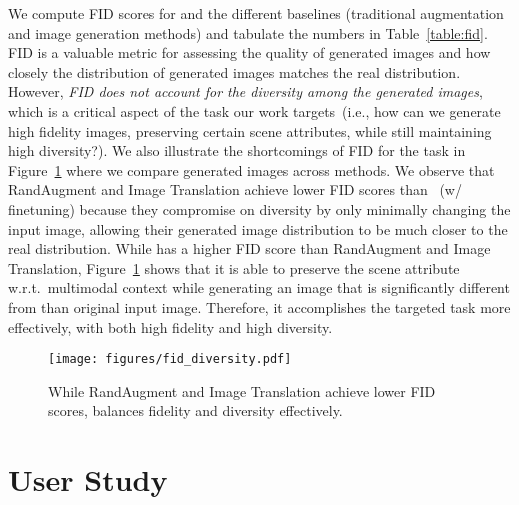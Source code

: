 We compute FID scores for \method and the different baselines (traditional augmentation and image generation methods) and tabulate the numbers in Table~\ref{table:fid}. FID is a valuable metric for assessing the quality of generated images and how closely the distribution of generated images matches the real distribution. However, \textit{FID does not account for the diversity among the generated images}, which is a critical aspect of the task our work targets~(i.e., how can we generate high fidelity images, preserving certain scene attributes, while still maintaining high diversity?). We also illustrate the shortcomings of FID for the task in Figure~\ref{fig:fid_diversity} where we compare generated images across methods. We observe that RandAugment and Image Translation achieve lower FID scores than \method~(w/ finetuning) because they compromise on diversity by only minimally changing the input image, allowing their generated image distribution to be much closer to the real distribution. While \method has a higher FID score than RandAugment and Image Translation, Figure~\ref{fig:fid_diversity} shows that it is able to preserve the scene attribute w.r.t.~multimodal context while generating an image that is significantly different from than original input image. Therefore, it accomplishes the targeted task more effectively, with both high fidelity and high diversity.


\begin{figure}[!h]
    \centering
    \texttt{[image: figures/fid\_diversity.pdf]}
    \caption{While RandAugment and Image Translation achieve lower FID scores, \method balances fidelity and diversity effectively.}
    \label{fig:fid_diversity}
\end{figure}

\section{User Study}

